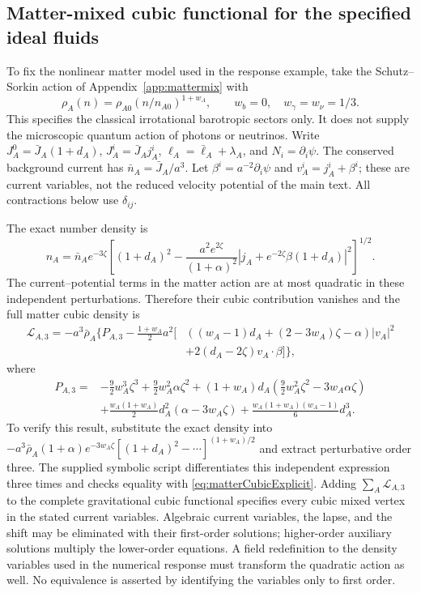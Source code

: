 \documentclass[aps,prd,reprint,onecolumn,notitlepage,nofootinbib,longbibliography,floatfix]{revtex4-2}
\theoremstyle{scstyle}
\theoremstyle{definition}
\theoremstyle{remark}
\begin{document}
\subsection{Matter-mixed cubic functional for the specified ideal fluids}
\label{sec:mixedCubicNew}
To fix the nonlinear matter model used in the response example, take
the Schutz--Sorkin action of Appendix~\ref{app:mattermix} with
\begin{equation}
 \rho_A(n)=\rho_{A0}(n/n_{A0})^{1+w_A},\qquad
 w_b=0,\quad w_\gamma=w_\nu=1/3.
 \label{eq:fluidNonlinearCompletion}
\end{equation}
This specifies the classical irrotational barotropic sectors only. It
does not supply the microscopic quantum action of photons or neutrinos.
Write $J_A^0=\bar J_A(1+d_A)$, $J_A^i=\bar J_Aj_A^i$,
$\ell_A=\bar\ell_A+\lambda_A$, and $N_i=\partial_i\psi$.
The conserved background current has $\bar n_A=\bar J_A/a^3$.
Let $\beta^i=a^{-2}\partial_i\psi$ and $v_A^i=j_A^i+\beta^i$;
these are current variables, not the reduced velocity potential of the
main text. All contractions below use $\delta_{ij}$.

The exact number density is
\begin{equation}
 n_A=\bar n_Ae^{-3\zeta}
 \left[(1+d_A)^2-\frac{a^2e^{2\zeta}}{(1+\alpha)^2}
 \left|j_A+e^{-2\zeta}\beta(1+d_A)\right|^2\right]^{1/2}.
\end{equation}
The current--potential terms in the matter action are at most quadratic
in these independent perturbations. Therefore their cubic contribution
vanishes and the full matter cubic density is
\begin{align}
 \mathcal L_{A,3}=-a^3\bar\rho_A\Big\{P_{A,3}
 -\frac{1+w_A}{2}a^2\big[&((w_A-1)d_A+(2-3w_A)\zeta-\alpha)|v_A|^2\nonumber\\
 &+2(d_A-2\zeta)v_A\cdot\beta\big]\Big\},
 \label{eq:matterCubicExplicit}
\end{align}
where
\begin{align}
 P_{A,3}={}&-\frac92w_A^3\zeta^3+\frac92w_A^2\alpha\zeta^2
 +(1+w_A)d_A\left(\frac92w_A^2\zeta^2-3w_A\alpha\zeta\right)\nonumber\\
 &+\frac{w_A(1+w_A)}2d_A^2(\alpha-3w_A\zeta)
 +\frac{w_A(1+w_A)(w_A-1)}6d_A^3.
\end{align}
To verify this result, substitute the exact density into
$-a^3\bar\rho_A(1+\alpha)e^{-3w_A\zeta}
[(1+d_A)^2-\cdots]^{(1+w_A)/2}$ and extract perturbative order three.
The supplied symbolic script differentiates this independent expression
three times and checks equality with \cref{eq:matterCubicExplicit}.
Adding $\sum_A\mathcal L_{A,3}$ to the complete gravitational cubic
functional specifies every cubic mixed vertex in the stated current
variables. Algebraic current variables, the lapse, and the shift may be
eliminated with their first-order solutions; higher-order auxiliary
solutions multiply the lower-order equations. A field redefinition to
the density variables used in the numerical response must transform the
quadratic action as well. No equivalence is asserted by identifying the
variables only to first order.
\end{document}
